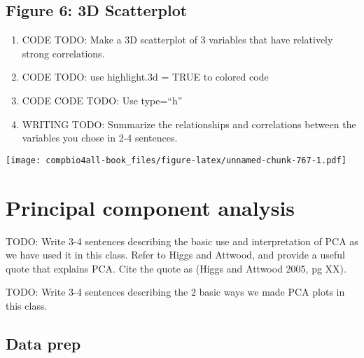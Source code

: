 \documentclass[
]{book}
\newenvironment{Shaded}{\begin{snugshade}}{\end{snugshade}}
\newcommand{\AttributeTok}[1]{\textcolor[rgb]{0.77,0.63,0.00}{#1}}
\newcommand{\ConstantTok}[1]{\textcolor[rgb]{0.00,0.00,0.00}{#1}}
\newcommand{\FunctionTok}[1]{\textcolor[rgb]{0.00,0.00,0.00}{#1}}
\newcommand{\NormalTok}[1]{#1}
\newcommand{\SpecialCharTok}[1]{\textcolor[rgb]{0.00,0.00,0.00}{#1}}
\newcommand{\StringTok}[1]{\textcolor[rgb]{0.31,0.60,0.02}{#1}}
\providecommand{\tightlist}{%
  \setlength{\itemsep}{0pt}\setlength{\parskip}{0pt}}
\begin{document}
\hypertarget{figure-6-3d-scatterplot}{%
\subsection{Figure 6: 3D Scatterplot}\label{figure-6-3d-scatterplot}}

\begin{enumerate}
\def\labelenumi{\arabic{enumi}.}
\tightlist
\item
  CODE TODO: Make a 3D scatterplot of 3 variables that have relatively strong correlations.
\item
  CODE TODO: use highlight.3d = TRUE to colored code
\item
  CODE CODE TODO: Use type=``h''
\item
  WRITING TODO: Summarize the relationships and correlations between the variables you chose in 2-4 sentences.
\end{enumerate}

\begin{Shaded}
\end{Shaded}

\texttt{[image: compbio4all-book\_files/figure-latex/unnamed-chunk-767-1.pdf]}

\hypertarget{principal-component-analysis}{%
\section{Principal component analysis}\label{principal-component-analysis}}

TODO: Write 3-4 sentences describing the basic use and interpretation of PCA as we have used it in this class. Refer to Higgs and Attwood, and provide a useful quote that explains PCA. Cite the quote as (Higgs and Attwood 2005, pg XX).

TODO: Write 3-4 sentences describing the 2 basic ways we made PCA plots in this class.

\hypertarget{data-prep}{%
\subsection{Data prep}\label{data-prep}}
\end{document}
